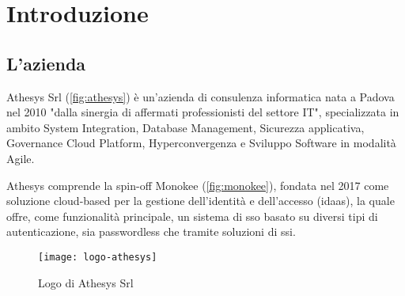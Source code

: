 
\chapter{Introduzione}
\label{cap:introduzione}







\section{L'azienda}

Athesys Srl (\autoref{fig:athesys}) è un'azienda di consulenza informatica nata a Padova nel 2010 "dalla sinergia di affermati professionisti del settore IT"\cite{site:athesys}, specializzata in ambito System Integration, Database Management, Sicurezza applicativa, Governance Cloud Platform, Hyperconvergenza e
Sviluppo Software in modalità Agile.

Athesys comprende la spin-off Monokee\cite{site:monokee} (\autoref{fig:monokee}), fondata nel 2017 come soluzione cloud-based per la gestione dell'identità
e dell'accesso (\acrfull{idaas}), la quale offre, come funzionalità principale, un sistema di \acrshort{sso} basato 
su diversi tipi di autenticazione, sia passwordless che tramite soluzioni di \acrfull{ssi}.

\vspace{20pt}
\begin{figure}[!h] 
    \centering 
    \texttt{[image: logo-athesys]} 
    \caption{Logo di Athesys Srl}
    \label{fig:athesys}
\end{figure}

